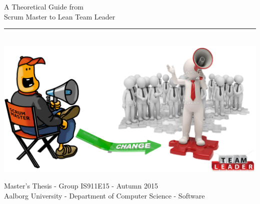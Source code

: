 \thispagestyle{empty}
\begin{flushright}
\vspace{3cm}

\phantom{hul}

\phantom{hul}

\phantom{hul}

\begin{center}
	\Huge{A Theoretical Guide from\\ Scrum Master to Lean Team Leader}
\end{center}
\vspace{1cm}

\rule{1\textwidth}{3mm} \\ \vspace{1.5cm}
\includegraphics[width=\textwidth]{Images/ScrumMasterToTeamLeader.png}
\vspace{1.5cm} \\
\vfill
\begin{center}
\Large{
Master's Thesis \hspace{0.5mm} - \hspace{0.5mm} Group IS911E15 \hspace{0.5mm} - \hspace{0.5mm} Autumn 2015\\
Aalborg University \hspace{0.5mm} - \hspace{0.5mm} Department of Computer Science \hspace{0.5mm} - \hspace{0.5mm} Software\\
~\\
}
\end{center}

\end{flushright}
